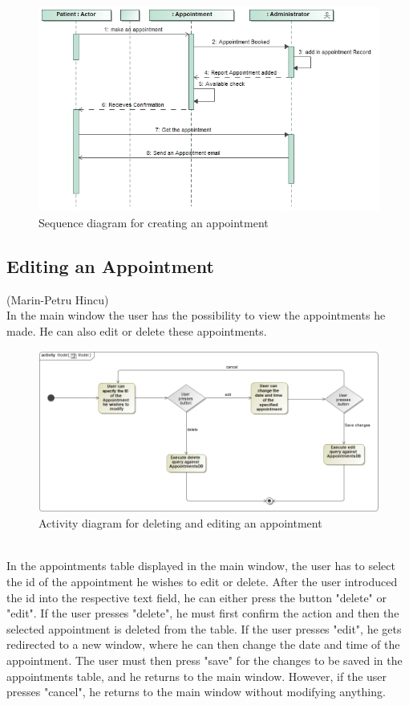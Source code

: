 \documentclass[a4paper, 12pt]{report}
\begin{document}
\begin{figure}[!h]
\includegraphics[width=\linewidth]{sequence_appointments.png}
\caption{Sequence diagram for creating an appointment}
\end{figure}

\subsection{Editing an Appointment}
{\tiny (Marin-Petru Hincu)\\}
In the main window the user has the possibility to view the appointments he made. He can also edit or delete these appointments.
\begin{figure}[!h]
\includegraphics[width=\linewidth]{acImg.png} 
\caption{Activity diagram for deleting and editing an appointment}
\end{figure}
\\In the appointments table displayed in the main window, the user has to select the id of the appointment he wishes to edit or delete. After the user introduced the id into the respective text field, he can either press the button "delete" or "edit". If the user presses "delete", he must first confirm the action and then the selected appointment is deleted from the table. If the user presses "edit", he gets redirected to a new window, where he can then change the date and time of the appointment. The user must then press "save" for the changes to be saved in the appointments table, and he returns to the main window. However, if the user presses "cancel", he returns to the main window without modifying anything.
\end{document}
